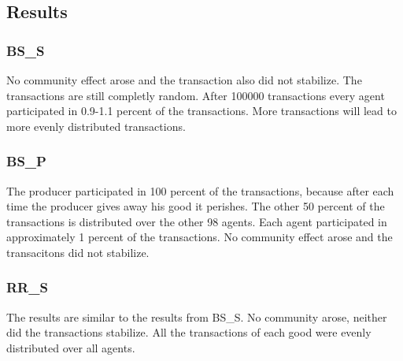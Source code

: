 \documentclass[twoside,openright]{uva-bachelor-thesis}
\begin{document}
\subsection{Results}

\subsubsection{BS\_S}
No community effect arose and the transaction also did not stabilize. The transactions are still completly random. After 100000 transactions every agent participated in 0.9-1.1 percent of the transactions. More transactions will lead to more evenly distributed transactions.

\subsubsection{BS\_P}
The producer participated in 100 percent of the transactions, because after each time the producer gives away his good it perishes. The other 50 percent of the transactions is distributed over the other 98 agents. Each agent participated in approximately 1 percent of the transactions. No community effect arose and the transacitons did not stabilize.

\subsubsection{RR\_S}
The results are similar to the results from BS\_S. No community arose, neither did the transactions stabilize. All the transactions of each good were evenly distributed over all agents. 
\end{document}
